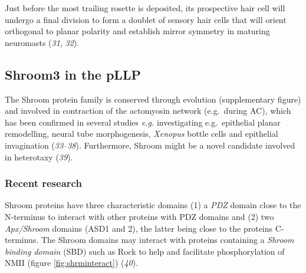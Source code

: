 \documentclass[11pt,singlespacinge,twoside]{reedthesis} %
\begin{document}
Just before the most trailing rosette is deposited, its prospective hair cell will undergo a final division to form a doublet of sensory hair cells that will orient orthogonal to planar polarity and establish mirror symmetry in maturing neuromasts (\emph{31}, \emph{32}).

\hypertarget{shroom3-in-the-pllp}{%
\subsection{Shroom3 in the pLLP}\label{shroom3-in-the-pllp}}

The Shroom protein family is conserved through evolution (supplementary figure) and involved in contraction of the actomyosin network (e.g.~during AC), which has been confirmed in several studies \emph{e.g.} investigating e.g.~epithelial planar remodelling, neural tube morphogenesis, \emph{Xenopus} bottle cells and epithelial invagination (\emph{33}--\emph{38}). Furthermore, Shroom might be a novel candidate involved in heterotaxy (\emph{39}).

\hypertarget{intro-shroom}{%
\subsubsection{Recent research}\label{intro-shroom}}

Shroom proteins have three characteristic domains (1) a \emph{PDZ} domain close to the N-terminus to interact with other proteins with PDZ domains and (2) two \emph{Apx/Shroom} domains (ASD1 and 2), the latter being close to the proteins C-terminus. The Shroom domains may interact with proteins containing a \emph{Shroom binding domain} (SBD) such as Rock to help and facilitate phosphorylation of NMII (figure \ref{fig:shrminteract}) (\emph{40}).
\end{document}
